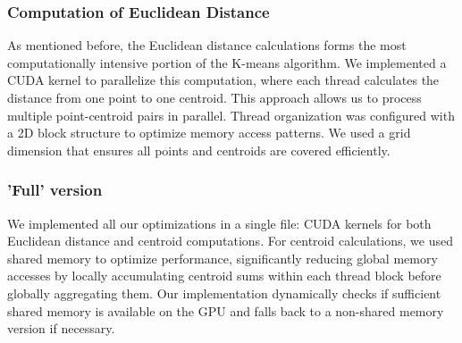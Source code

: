 \documentclass[sigconf]{acmart}
\begin{document}
\subsubsection{Computation of Euclidean Distance}
As mentioned before, the Euclidean distance calculations forms the most computationally intensive portion of the K-means algorithm. We implemented a CUDA kernel to parallelize this computation, where each thread calculates the distance from one point to one centroid. This approach allows us to process multiple point-centroid pairs in parallel. Thread organization was configured with a 2D block structure to optimize memory access patterns. We used a grid dimension that ensures all points and centroids are covered efficiently.

\subsubsection{'Full' version} We implemented all our optimizations in a single file: CUDA kernels for both Euclidean distance and centroid computations. For centroid calculations, we used shared memory to optimize performance, significantly reducing global memory accesses by locally accumulating centroid sums within each thread block before globally aggregating them. Our implementation dynamically checks if sufficient shared memory is available on the GPU and falls back to a non-shared memory version if necessary.
\end{document}
